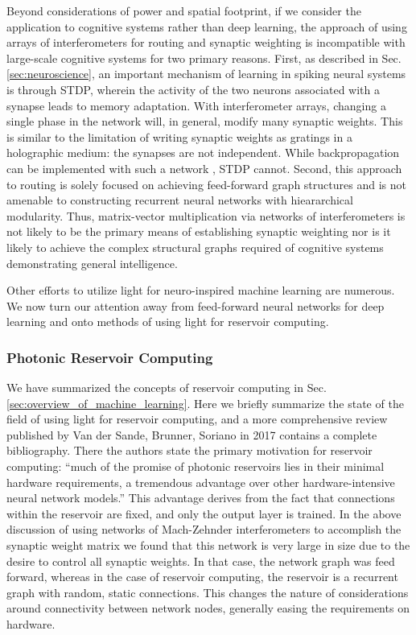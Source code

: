Beyond considerations of power and spatial footprint, if we consider the application to cognitive systems rather than deep learning, the approach of using arrays of interferometers for routing and synaptic weighting is incompatible with large-scale cognitive systems for two primary reasons. First, as described in Sec.\,\ref{sec:neuroscience}, an important mechanism of learning in spiking neural systems is through STDP, wherein the activity of the two neurons associated with a synapse leads to memory adaptation. With interferometer arrays, changing a single phase in the network will, in general, modify many synaptic weights. This is similar to the limitation of writing synaptic weights as gratings in a holographic medium: the synapses are not independent. While backpropagation can be implemented with such a network \cite{humi2018}, STDP cannot. Second, this approach to routing is solely focused on achieving feed-forward graph structures and is not amenable to constructing recurrent neural networks with hieararchical modularity. Thus, matrix-vector multiplication via networks of interferometers is not likely to be the primary means of establishing synaptic weighting nor is it likely to achieve the complex structural graphs required of cognitive systems demonstrating general intelligence.

Other efforts to utilize light for neuro-inspired machine learning are numerous. We now turn our attention away from feed-forward neural networks for deep learning and onto methods of using light for reservoir computing.

\subsubsection{Photonic Reservoir Computing}
We have summarized the concepts of reservoir computing in Sec.\,\ref{sec:overview_of_machine_learning}. Here we briefly summarize the state of the field of using light for reservoir computing, and a more comprehensive review published by Van der Sande, Brunner, Soriano in 2017 \cite{vabr2017} contains a complete bibliography. There the authors state the primary motivation for reservoir computing: ``much of the promise of photonic reservoirs lies in their minimal hardware requirements, a tremendous advantage over other hardware-intensive neural network models.'' This advantage derives from the fact that connections within the reservoir are fixed, and only the output layer is trained. In the above discussion of using networks of Mach-Zehnder interferometers to accomplish the synaptic weight matrix we found that this network is very large in size due to the desire to control all synaptic weights. In that case, the network graph was feed forward, whereas in the case of reservoir computing, the reservoir is a recurrent graph with random, static connections. This changes the nature of considerations around connectivity between network nodes, generally easing the requirements on hardware. 

